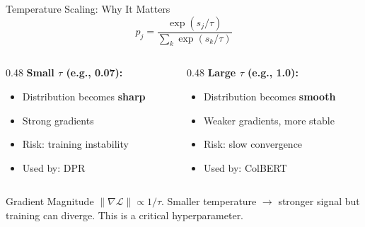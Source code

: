 \documentclass[aspectratio=169]{beamer}
\newif\ifanimated
\newcommand{\cpause}{\ifanimated\pause\fi}
\begin{document}
\begin{frame}{Temperature Scaling: Why It Matters}
$$p_j = \frac{\exp(s_j / \tau)}{\sum_k \exp(s_k / \tau)}$$

\vspace{0.5em}

\begin{columns}
\begin{column}{0.48\textwidth}
\textbf{Small $\tau$ (e.g., 0.07):}
\begin{itemize}
    \item Distribution becomes \textbf{sharp}
    \item Strong gradients
    \item Risk: training instability
    \item Used by: DPR
\end{itemize}
\end{column}
\begin{column}{0.48\textwidth}
\textbf{Large $\tau$ (e.g., 1.0):}
\begin{itemize}
    \item Distribution becomes \textbf{smooth}
    \item Weaker gradients, more stable
    \item Risk: slow convergence
    \item Used by: ColBERT
\end{itemize}
\end{column}
\end{columns}

\cpause
\vspace{1em}

\begin{alertblock}{Gradient Magnitude}
$\|\nabla \mathcal{L}\| \propto 1/\tau$. Smaller temperature $\to$ stronger signal but training can diverge. This is a critical hyperparameter.
\end{alertblock}
\end{frame}
\end{document}
